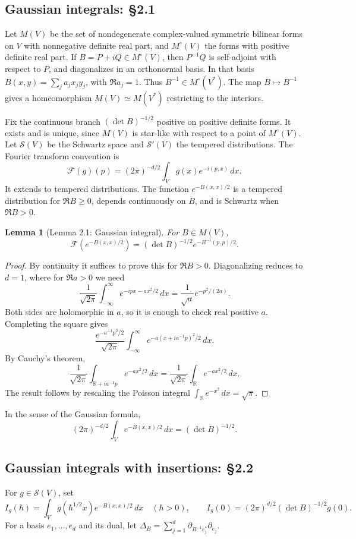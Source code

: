 \documentclass[UTF8,11pt,a4paper]{ctexart}
\newtheorem*{lemma}{Lemma}
\theoremstyle{definition}\newtheorem*{definition}{Definition}
\theoremstyle{remark}\newtheorem*{remark}{Remark}
\newcommand{\R}{\mathbb R}
\begin{document}
\subsection*{Gaussian integrals: §2.1}
Let $M(V)$ be the set of nondegenerate complex-valued symmetric bilinear forms on $V$ with nonnegative definite real part, and $M^\circ(V)$ the forms with positive definite real part. If $B=P+iQ\in M^\circ(V)$, then $P^{-1}Q$ is self-adjoint with respect to $P$, and diagonalizes in an orthonormal basis. In that basis $B(x,y)=\sum_j a_jx_jy_j$, with $\Re a_j=1$. Thus $B^{-1}\in M^\circ(V^*)$. The map $B\mapsto B^{-1}$ gives a homeomorphism $M(V)\simeq M(V^*)$ restricting to the interiors.

Fix the continuous branch $(\det B)^{-1/2}$ positive on positive definite forms. It exists and is unique, since $M(V)$ is star-like with respect to a point of $M^\circ(V)$. Let $\mathcal S(V)$ be the Schwartz space and $\mathcal S'(V)$ the tempered distributions. The Fourier transform convention is
\[
\mathcal F(g)(p)=(2\pi)^{-d/2}\int_V g(x)e^{-i(p,x)}\,dx.
\]
It extends to tempered distributions. The function $e^{-B(x,x)/2}$ is a tempered distribution for $\Re B\ge0$, depends continuously on $B$, and is Schwartz when $\Re B>0$.

\begin{lemma}[Lemma 2.1: Gaussian integral]
For $B\in M(V)$,
\[
\mathcal F\left(e^{-B(x,x)/2}\right)
=(\det B)^{-1/2}e^{-B^{-1}(p,p)/2}.
\]
\end{lemma}
\begin{proof}
By continuity it suffices to prove this for $\Re B>0$. Diagonalizing reduces to $d=1$, where for $\Re a>0$ we need
\[
\frac1{\sqrt{2\pi}}\int_{-\infty}^{\infty}e^{-ipx-ax^2/2}\,dx
=\frac1{\sqrt a}e^{-p^2/(2a)}.
\]
Both sides are holomorphic in $a$, so it is enough to check real positive $a$. Completing the square gives
\[
\frac{e^{-a^{-1}p^2/2}}{\sqrt{2\pi}}
\int_{-\infty}^{\infty}e^{-a(x+ia^{-1}p)^2/2}\,dx.
\]
By Cauchy's theorem,
\[
\frac1{\sqrt{2\pi}}\int_{\R+ia^{-1}p}e^{-ax^2/2}\,dx
=\frac1{\sqrt{2\pi}}\int_\R e^{-ax^2/2}\,dx.
\]
The result follows by rescaling the Poisson integral $\int_\R e^{-x^2}\,dx=\sqrt\pi$.
\end{proof}
In the sense of the Gaussian formula,
\[
(2\pi)^{-d/2}\int_V e^{-B(x,x)/2}\,dx=(\det B)^{-1/2}.
\]

\subsection*{Gaussian integrals with insertions: §2.2}
For $g\in\mathcal S(V)$, set
\[
I_g(\hbar)=\int_V g(\hbar^{1/2}x)e^{-B(x,x)/2}\,dx\quad(\hbar>0),
\qquad I_g(0)=(2\pi)^{d/2}(\det B)^{-1/2}g(0).
\]
For a basis $e_1,\ldots,e_d$ and its dual, let $\Delta_B=\sum_{j=1}^d\partial_{B^{-1}e_j^*}\partial_{e_j}$.
\end{document}
